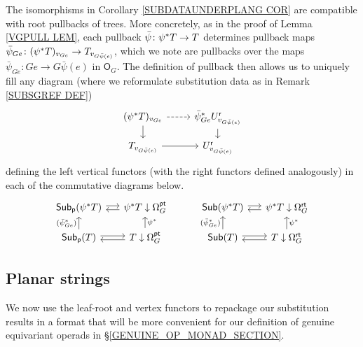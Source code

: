 \documentclass[a4paper,10pt]{article}%
\begin{document}
\begin{remark}\label{PULLCOMP REM}
	The isomorphisms in Corollary \ref{SUBDATAUNDERPLANG COR}
	are compatible with root pullbacks of trees. 
	More concretely, as in the proof of Lemma \ref{VGPULL LEM},
	each pullback 
	$\bar{\psi} \colon \psi^{\**} T \to T$
	determines pullback maps
	$\bar{\psi}_{G e} \colon
	(\psi^{\**} T)_{v_{Ge}} \to T_{v_{G \bar{\psi}(e)}}$,
	which we note are pullbacks over the maps
	$\bar{\psi}_{G e} \colon Ge \to G \bar{\psi}(e)$
	in $\mathsf{O}_G$. The definition of pullback then allows us to uniquely fill any diagram (where we reformulate substitution data as in Remark \ref{SUBSGREF DEF})
\[
\begin{tikzcd}[row sep =10pt]
	(\psi^{\**} T)_{v_{Ge}} \ar{d} \ar[dashed]{r} &
	\bar{\psi}_{G e}^{\**}U_{v_{G \bar{\psi}(e)}}^{\mathsf{r}} \ar{d}
\\
	T_{v_{G \bar{\psi}(e)}} \ar{r} &
	U_{v_{G \bar{\psi}(e)}}^{\mathsf{r}}
\end{tikzcd}	
\]
defining the left vertical functors (with the right functors defined analogously) in each of the commutative diagrams below.
\begin{equation}\label{SUBDATAUNDERPLANG2 EQ}
\begin{tikzcd}[row sep =12pt,column sep= 14pt]
	\mathsf{Sub}_{\mathsf{p}}(\psi^{\**} T) \ar[r,shift left=2pt] &
	\psi^{\**} T \downarrow \Omega_{G}^{\mathsf{pt}} \ar[l,shift left=2pt] & &
	\mathsf{Sub}(\psi^{\**} T) \ar[r,shift left=2pt] &
	\psi^{\**} T \downarrow \Omega_{G}^{\mathsf{rt}} \ar[l,shift left=2pt]
\\
	\mathsf{Sub}_{\mathsf{p}}(T) \ar[r,shift left=2pt] \ar{u}{(\bar{\psi}_{Ge}^{\**})} &
	T \downarrow \Omega_{G}^{\mathsf{pt}} \ar[l,shift left=2pt] \ar{u}[swap]{\psi^{\**}} & &
	\mathsf{Sub}(T) \ar[r,shift left=2pt] \ar{u}{(\bar{\psi}_{Ge}^{\**})} &
	T \downarrow \Omega_{G}^{\mathsf{rt}} \ar[l,shift left=2pt] \ar{u}[swap]{\psi^{\**}}
\end{tikzcd}
\end{equation}
\end{remark}


\subsection{Planar strings}\label{PLANARSTRING SEC}

We now use the leaf-root and vertex functors to repackage 
our substitution results in a format that will be more convenient for our definition of genuine equivariant operads in \S \ref{GENUINE_OP_MONAD_SECTION}.
\end{document}
